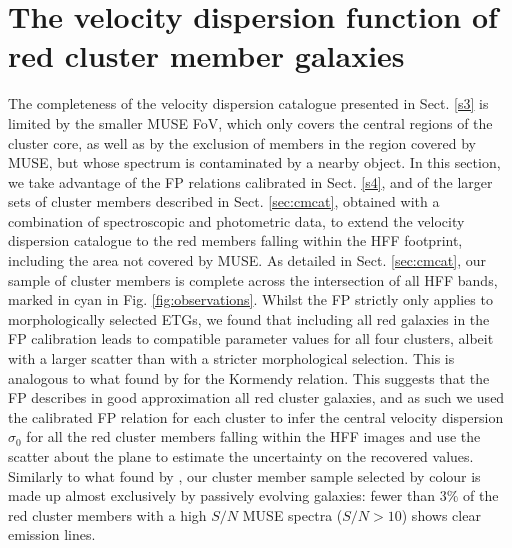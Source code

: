\documentclass{aa}
\begin{document}
\section{The velocity dispersion function of red cluster member galaxies}\label{s5}

The completeness of the velocity dispersion catalogue presented in Sect. \ref{s3} is limited by the smaller MUSE FoV, which only covers the central regions of the cluster core, as well as by the exclusion of members in the region covered by MUSE, but whose spectrum is contaminated by a nearby object. In this section, we take advantage of the FP relations calibrated in Sect. \ref{s4}, and of the larger sets of cluster members described in Sect. \ref{sec:cmcat}, obtained with a combination of spectroscopic and photometric data, to extend the velocity dispersion catalogue to the red members falling within the HFF footprint, including the area not covered by MUSE. As detailed in Sect. \ref{sec:cmcat}, our sample of cluster members is complete across the intersection of all HFF bands, marked in cyan in Fig. \ref{fig:observations}. Whilst the FP strictly only applies to morphologically selected ETGs, we found that including all red galaxies in the FP calibration leads to compatible parameter values for all four clusters, albeit with a larger scatter than with a stricter morphological selection. This is analogous to what found by \cite{tortorelli18} for the Kormendy relation. This suggests that the FP describes in good approximation all red cluster galaxies, and as such we used the calibrated FP relation for each cluster to infer the central velocity dispersion $\sigma_0$ for all the red cluster members falling within the HFF images and use the scatter about the plane to estimate the uncertainty on the recovered values. Similarly to what found by \cite{tortorelli18}, our cluster member sample selected by colour is made up almost exclusively by passively evolving galaxies: fewer than $3\%$ of the red cluster members with a high $S/N$ MUSE spectra ($S/N>10$) shows clear emission lines.
\end{document}
